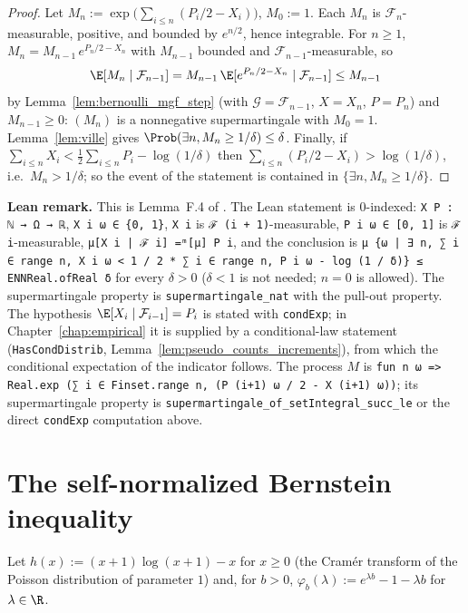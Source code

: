 \begin{proof}
\leanok
Let $M_n := \exp\big(\sum_{i \le n} (P_i/2 - X_i)\big)$, $M_0 := 1$. Each $M_n$ is
$\mathcal F_n$-measurable, positive, and bounded by $e^{n/2}$, hence integrable. For $n \ge 1$,
$M_n = M_{n-1}\, e^{P_n/2 - X_n}$ with $M_{n-1}$ bounded and $\mathcal F_{n-1}$-measurable, so
\[
  \E[M_n \mid \mathcal F_{n-1}] = M_{n-1}\, \E[e^{P_n/2 - X_n} \mid \mathcal F_{n-1}] \le M_{n-1}
\]
by Lemma~\ref{lem:bernoulli_mgf_step} (with $\mathcal G = \mathcal F_{n-1}$, $X = X_n$,
$P = P_n$) and $M_{n-1} \ge 0$: $(M_n)$ is a nonnegative supermartingale with $M_0 = 1$.
Lemma~\ref{lem:ville} gives $\Prob(\exists n, M_n \ge 1/\delta) \le \delta$. Finally, if
$\sum_{i \le n} X_i < \frac12 \sum_{i \le n} P_i - \log(1/\delta)$ then
$\sum_{i \le n}(P_i/2 - X_i) > \log(1/\delta)$, i.e.\ $M_n > 1/\delta$; so the event of the
statement is contained in $\{\exists n, M_n \ge 1/\delta\}$.
\end{proof}

\textbf{Lean remark.} This is Lemma~F.4 of \cite{dann2017unifying}. The Lean statement is
$0$-indexed: \texttt{X P : ℕ → Ω → ℝ}, \texttt{X i ω ∈ \{0, 1\}}, \texttt{X i} is
\texttt{ℱ (i + 1)}-measurable, \texttt{P i ω ∈ [0, 1]} is \texttt{ℱ i}-measurable,
\texttt{μ[X i | ℱ i] =ᵐ[μ] P i}, and the conclusion is
\texttt{μ \{ω | ∃ n, ∑ i ∈ range n, X i ω < 1 / 2 * ∑ i ∈ range n, P i ω - log (1 / δ)\} ≤ ENNReal.ofReal δ}
for every $\delta > 0$ ($\delta < 1$ is not needed; $n = 0$ is allowed). The supermartingale
property is \texttt{supermartingale\_nat} with the pull-out property. The hypothesis
$\E[X_i \mid \mathcal F_{i-1}] = P_i$ is stated with \texttt{condExp}; in
Chapter~\ref{chap:empirical} it is supplied by a conditional-law statement
(\texttt{HasCondDistrib}, Lemma~\ref{lem:pseudo_counts_increments}), from which the
conditional expectation of the indicator follows. The process $M$ is
\texttt{fun n ω => Real.exp (∑ i ∈ Finset.range n, (P (i+1) ω / 2 - X (i+1) ω))}; its
supermartingale property is \texttt{supermartingale\_of\_setIntegral\_succ\_le} or the
direct \texttt{condExp} computation above.

\section{The self-normalized Bernstein inequality}
\label{sec:pconc_bernstein}

Let $h(x) := (x + 1)\log(x + 1) - x$ for $x \ge 0$ (the Cramér transform of the Poisson
distribution of parameter $1$) and, for $b > 0$, $\varphi_b(\lambda) := e^{\lambda b} - 1 - \lambda b$
for $\lambda \in \R$.

